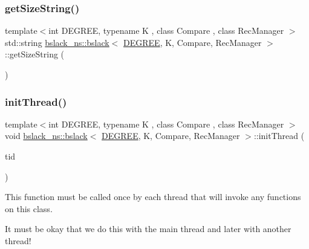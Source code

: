 \subsubsection{\texorpdfstring{get\+Size\+String()}{getSizeString()}}
{\footnotesize\ttfamily template$<$int D\+E\+G\+R\+EE, typename K , class Compare , class Rec\+Manager $>$ \\
std\+::string \hyperlink{classbslack__ns_1_1bslack}{bslack\+\_\+ns\+::bslack}$<$ \hyperlink{brown__sigouin__abtree__kcas_2adapter_8h_a5d88b17d70c985f2f2b8e987037fd6dd}{D\+E\+G\+R\+EE}, K, Compare, Rec\+Manager $>$\+::get\+Size\+String (\begin{DoxyParamCaption}{ }\end{DoxyParamCaption})\hspace{0.3cm}{\ttfamily [inline]}}

\mbox{\label{classbslack__ns_1_1bslack_a1fafbe3eb053883706fb6b93ef1fe01e}} 
\subsubsection{\texorpdfstring{init\+Thread()}{initThread()}}
{\footnotesize\ttfamily template$<$int D\+E\+G\+R\+EE, typename K , class Compare , class Rec\+Manager $>$ \\
void \hyperlink{classbslack__ns_1_1bslack}{bslack\+\_\+ns\+::bslack}$<$ \hyperlink{brown__sigouin__abtree__kcas_2adapter_8h_a5d88b17d70c985f2f2b8e987037fd6dd}{D\+E\+G\+R\+EE}, K, Compare, Rec\+Manager $>$\+::init\+Thread (\begin{DoxyParamCaption}\item[{const int}]{tid }\end{DoxyParamCaption})\hspace{0.3cm}{\ttfamily [inline]}}

This function must be called once by each thread that will invoke any functions on this class.

It must be okay that we do this with the main thread and later with another thread! \mbox{\label{classbslack__ns_1_1bslack_a2ec4a46e691585ca87b6cb7410b9adf4}} 

